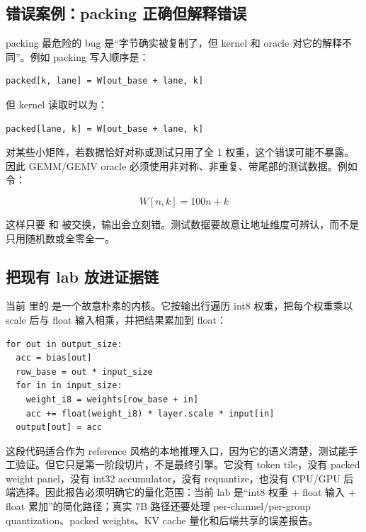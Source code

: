 \subsection{错误案例：packing 正确但解释错误}

packing 最危险的 bug 是“字节确实被复制了，但 kernel 和 oracle 对它的解释不同”。例如 packing 写入顺序是：

\begin{lstlisting}[numbers=none]
packed[k, lane] = W[out_base + lane, k]
\end{lstlisting}

但 kernel 读取时以为：

\begin{lstlisting}[numbers=none]
packed[lane, k] = W[out_base + lane, k]
\end{lstlisting}

对某些小矩阵，若数据恰好对称或测试只用了全 1 权重，这个错误可能不暴露。因此 GEMM/GEMV oracle 必须使用非对称、非重复、带尾部的测试数据。例如令：

\[
W[n,k] = 100n + k
\]

这样只要  和  被交换，输出会立刻错。测试数据要故意让地址维度可辨认，而不是只用随机数或全零全一。

\subsection{把现有 lab 放进证据链}

当前  里的  是一个故意朴素的内核。它按输出行遍历 int8 权重，把每个权重乘以 scale 后与 float 输入相乘，并把结果累加到 float：

\begin{lstlisting}[numbers=none,caption={当前 lab 的线性层机器账本}]
for out in output_size:
  acc = bias[out]
  row_base = out * input_size
  for in in input_size:
    weight_i8 = weights[row_base + in]
    acc += float(weight_i8) * layer.scale * input[in]
  output[out] = acc
\end{lstlisting}

这段代码适合作为 reference 风格的本地推理入口，因为它的语义清楚，测试能手工验证。但它只是第一阶段切片，不是最终引擎。它没有 token tile，没有 packed weight panel，没有 int32 accumulator，没有 requantize，也没有 CPU/GPU 后端选择。因此报告必须明确它的量化范围：当前 lab 是“int8 权重 + float 输入 + float 累加”的简化路径；真实 7B 路径还要处理 per-channel/per-group quantization、packed weights、KV cache 量化和后端共享的误差报告。

